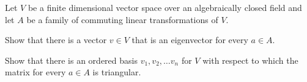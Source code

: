 Let $V$ be a finite dimensional vector space over an algebraically
closed field and let $A$ be a family of commuting linear
transformations of $V$.
\begin{alist}
\item Show that there is a vector $v\in V$ that is an eigenvector
for every $a\in A$.
\item Show that there is an ordered basis $v_1,v_2,\ldots v_n$ for $V$
with respect to which the matrix for every $a\in A$ is triangular.
\end{alist}
